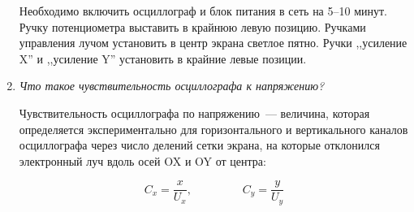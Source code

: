 \documentclass[paper=a4,10pt,pagesize]{scrartcl}
\begin{document}
\begin{enumerate}
Необходимо включить осциллограф и блок питания в сеть на 5--10 минут.
Ручку потенциометра выставить в крайнюю левую позицию.
Ручками управления лучом установить в центр экрана светлое пятно.
Ручки ,,усиление X'' и ,,усиление Y'' установить в крайние левые позиции.
\item \textit{Что такое чувствительность осциллографа к напряжению?}

Чувствительность осциллографа по напряжению~--- величина, которая определяется экспериментально для горизонтального и вертикального каналов осциллографа через число делений сетки экрана, на которые отклонился электронный луч вдоль осей OX и OY от центра:

$$C_x=\frac{x}{U_x}, ~~~~~~~~~~~~~~~~~~~~C_y=\frac{y}{U_y}$$
\end{enumerate}
\end{document}
